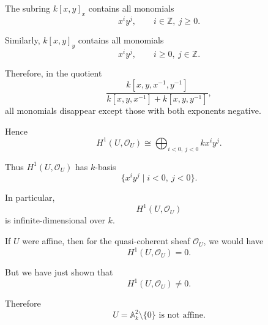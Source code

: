 The subring \(k[x,y]_x\) contains all monomials
\[
x^iy^j,
\qquad i\in\mathbb Z,\ j\geq0.
\]

Similarly, \(k[x,y]_y\) contains all monomials
\[
x^iy^j,
\qquad i\geq0,\ j\in\mathbb Z.
\]

Therefore, in the quotient
\[
\frac{k[x,y,x^{-1},y^{-1}]}
{k[x,y,x^{-1}]+k[x,y,y^{-1}]},
\]
all monomials disappear except those with both exponents negative.

Hence
\[
H^1(U,\mathcal O_U)
\cong
\bigoplus_{i<0,\ j<0} kx^iy^j.
\]

Thus \(H^1(U,\mathcal O_U)\) has \(k\)-basis
\[
\{x^iy^j\mid i<0,\ j<0\}.
\]

In particular,
\[
H^1(U,\mathcal O_U)
\]
is infinite-dimensional over \(k\).

If \(U\) were affine, then for the quasi-coherent sheaf \(\mathcal O_U\),
we would have
\[
H^1(U,\mathcal O_U)=0.
\]

But we have just shown that
\[
H^1(U,\mathcal O_U)\neq0.
\]

Therefore
\[
\boxed{
	U=\mathbb A_k^2\setminus\{0\}
	\text{ is not affine.}
}
\]

